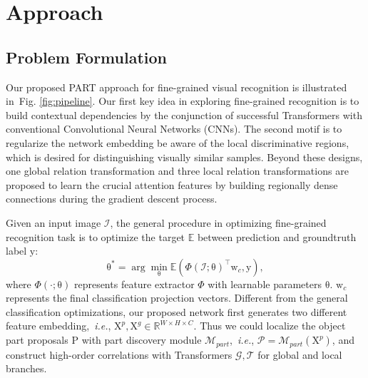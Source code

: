 \documentclass[journal]{IEEEtran}
\def\ie{{\em i.e.}}
\newcommand{\figref}[1]{Fig. \ref{#1}}
\newcommand{\mc}[1]{\mathcal{#1}}
\newcommand{\br}[1]{\bm{\mathrm{#1}}}
\begin{document}
\section{Approach}\label{sec:method}
\subsection{Problem Formulation}\label{sec:formulate}
Our proposed PART approach for fine-grained visual recognition is illustrated in~\figref{fig:pipeline}. Our first key idea in exploring fine-grained recognition is to build contextual dependencies by the conjunction of successful Transformers with conventional Convolutional Neural Networks (CNNs). The second motif is to regularize the network embedding be aware of the local discriminative regions, which is desired for distinguishing visually similar samples. Beyond these designs, one global relation transformation and three local relation transformations are proposed to learn the crucial attention features by building regionally dense connections during the gradient descent process.

Given an input image $\mc{I}$, the general procedure in optimizing fine-grained recognition task is to optimize the target $\mathbb{E}$ between prediction and groundtruth label $\br{y}$:
\begin{equation}\label{eq:globalform}
\br{\theta}^{*}=\arg\min_{\br{\theta}} \mathbb{E}(\Phi(\mc{I};\br{\theta})^{\top}\br{w}_c, \br{y}),
\end{equation}
where $\Phi(\cdot;\br{\theta})$ represents feature extractor $\Phi$ with learnable parameters $\br{\theta}$. $\br{w}_c$ represents the final classification projection vectors. Different from the general classification optimizations, our proposed network first generates two different feature embedding,~\ie, $\br{X}^p,\br{X}^g \in \mathbb{R}^{W \times H \times C}$. Thus we could localize the object part proposals $\br{P}$ with part discovery module $\mc{M}_{part}$,~\ie, $\mc{P}=\mc{M}_{part}(\br{X}^p)$, and construct high-order correlations with Transformers $\mc{G},\mc{T}$ for global and local branches.
\end{document}
